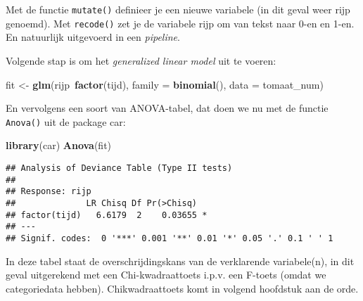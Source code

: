 \documentclass[]{book}
\newenvironment{Shaded}{\begin{snugshade}}{\end{snugshade}}
\newcommand{\KeywordTok}[1]{\textcolor[rgb]{0.13,0.29,0.53}{\textbf{{#1}}}}
\newcommand{\DataTypeTok}[1]{\textcolor[rgb]{0.13,0.29,0.53}{{#1}}}
\newcommand{\DecValTok}[1]{\textcolor[rgb]{0.00,0.00,0.81}{{#1}}}
\newcommand{\StringTok}[1]{\textcolor[rgb]{0.31,0.60,0.02}{{#1}}}
\newcommand{\NormalTok}[1]{{#1}}
\theoremstyle{definition}
\theoremstyle{definition}
\theoremstyle{definition}
\theoremstyle{remark}
\begin{document}
\begin{Shaded}
\end{Shaded}

Met de functie \texttt{mutate()} definieer je een nieuwe variabele (in
dit geval weer rijp genoemd). Met \texttt{recode()} zet je de variabele
rijp om van tekst naar 0-en en 1-en. En natuurlijk uitgevoerd in een
\emph{pipeline}.

Volgende stap is om het \emph{generalized linear model} uit te voeren:

\begin{Shaded}
\begin{Highlighting}[]
\NormalTok{fit <-}\StringTok{ }\KeywordTok{glm}\NormalTok{(rijp~}\KeywordTok{factor}\NormalTok{(tijd), }\DataTypeTok{family =} \KeywordTok{binomial}\NormalTok{(), }\DataTypeTok{data =} \NormalTok{tomaat_num)}
\end{Highlighting}
\end{Shaded}

En vervolgens een soort van ANOVA-tabel, dat doen we nu met de functie
\texttt{Anova()} uit de package car:

\begin{Shaded}
\begin{Highlighting}[]
\KeywordTok{library}\NormalTok{(car)}
\KeywordTok{Anova}\NormalTok{(fit)}
\end{Highlighting}
\end{Shaded}

\begin{verbatim}
## Analysis of Deviance Table (Type II tests)
## 
## Response: rijp
##              LR Chisq Df Pr(>Chisq)  
## factor(tijd)   6.6179  2    0.03655 *
## ---
## Signif. codes:  0 '***' 0.001 '**' 0.01 '*' 0.05 '.' 0.1 ' ' 1
\end{verbatim}

In deze tabel staat de overschrijdingskans van de verklarende
variabele(n), in dit geval uitgerekend met een Chi-kwadraattoets i.p.v.
een F-toets (omdat we categoriedata hebben). Chikwadraattoets komt in
volgend hoofdstuk aan de orde.
\end{document}
